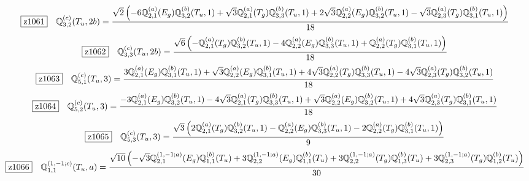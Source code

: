 \documentclass[fleqn,10pt,landscape]{jsarticle}
\begin{document}
\begin{dmath*}
\hspace*{3mm}\fbox{z1061}\quad \mathbb{Q}_{3,2}^{(c)}(T_{u},2b)=\frac{\sqrt{2} \left(- 6 \mathbb{Q}_{2,1}^{(a)}(E_{g}) \mathbb{Q}_{3,2}^{(b)}(T_{u},1) + \sqrt{3} \mathbb{Q}_{2,1}^{(a)}(T_{g}) \mathbb{Q}_{3,3}^{(b)}(T_{u},1) + 2 \sqrt{3} \mathbb{Q}_{2,2}^{(a)}(E_{g}) \mathbb{Q}_{3,2}^{(b)}(T_{u},1) - \sqrt{3} \mathbb{Q}_{2,3}^{(a)}(T_{g}) \mathbb{Q}_{3,1}^{(b)}(T_{u},1)\right)}{18}
\end{dmath*}
\begin{dmath*}
\hspace*{3mm}\fbox{z1062}\quad \mathbb{Q}_{3,3}^{(c)}(T_{u},2b)=\frac{\sqrt{6} \left(- \mathbb{Q}_{2,1}^{(a)}(T_{g}) \mathbb{Q}_{3,2}^{(b)}(T_{u},1) - 4 \mathbb{Q}_{2,2}^{(a)}(E_{g}) \mathbb{Q}_{3,3}^{(b)}(T_{u},1) + \mathbb{Q}_{2,2}^{(a)}(T_{g}) \mathbb{Q}_{3,1}^{(b)}(T_{u},1)\right)}{18}
\end{dmath*}
\begin{dmath*}
\hspace*{3mm}\fbox{z1063}\quad \mathbb{Q}_{5,1}^{(c)}(T_{u},3)=\frac{3 \mathbb{Q}_{2,1}^{(a)}(E_{g}) \mathbb{Q}_{3,1}^{(b)}(T_{u},1) + \sqrt{3} \mathbb{Q}_{2,2}^{(a)}(E_{g}) \mathbb{Q}_{3,1}^{(b)}(T_{u},1) + 4 \sqrt{3} \mathbb{Q}_{2,2}^{(a)}(T_{g}) \mathbb{Q}_{3,3}^{(b)}(T_{u},1) - 4 \sqrt{3} \mathbb{Q}_{2,3}^{(a)}(T_{g}) \mathbb{Q}_{3,2}^{(b)}(T_{u},1)}{18}
\end{dmath*}
\begin{dmath*}
\hspace*{3mm}\fbox{z1064}\quad \mathbb{Q}_{5,2}^{(c)}(T_{u},3)=\frac{- 3 \mathbb{Q}_{2,1}^{(a)}(E_{g}) \mathbb{Q}_{3,2}^{(b)}(T_{u},1) - 4 \sqrt{3} \mathbb{Q}_{2,1}^{(a)}(T_{g}) \mathbb{Q}_{3,3}^{(b)}(T_{u},1) + \sqrt{3} \mathbb{Q}_{2,2}^{(a)}(E_{g}) \mathbb{Q}_{3,2}^{(b)}(T_{u},1) + 4 \sqrt{3} \mathbb{Q}_{2,3}^{(a)}(T_{g}) \mathbb{Q}_{3,1}^{(b)}(T_{u},1)}{18}
\end{dmath*}
\begin{dmath*}
\hspace*{3mm}\fbox{z1065}\quad \mathbb{Q}_{5,3}^{(c)}(T_{u},3)=\frac{\sqrt{3} \left(2 \mathbb{Q}_{2,1}^{(a)}(T_{g}) \mathbb{Q}_{3,2}^{(b)}(T_{u},1) - \mathbb{Q}_{2,2}^{(a)}(E_{g}) \mathbb{Q}_{3,3}^{(b)}(T_{u},1) - 2 \mathbb{Q}_{2,2}^{(a)}(T_{g}) \mathbb{Q}_{3,1}^{(b)}(T_{u},1)\right)}{9}
\end{dmath*}
\begin{dmath*}
\hspace*{3mm}\fbox{z1066}\quad \mathbb{Q}_{1,1}^{(1,-1;c)}(T_{u},a)=\frac{\sqrt{10} \left(- \sqrt{3} \mathbb{Q}_{2,1}^{(1,-1;a)}(E_{g}) \mathbb{Q}_{1,1}^{(b)}(T_{u}) + 3 \mathbb{Q}_{2,2}^{(1,-1;a)}(E_{g}) \mathbb{Q}_{1,1}^{(b)}(T_{u}) + 3 \mathbb{Q}_{2,2}^{(1,-1;a)}(T_{g}) \mathbb{Q}_{1,3}^{(b)}(T_{u}) + 3 \mathbb{Q}_{2,3}^{(1,-1;a)}(T_{g}) \mathbb{Q}_{1,2}^{(b)}(T_{u})\right)}{30}
\end{dmath*}
\end{document}
